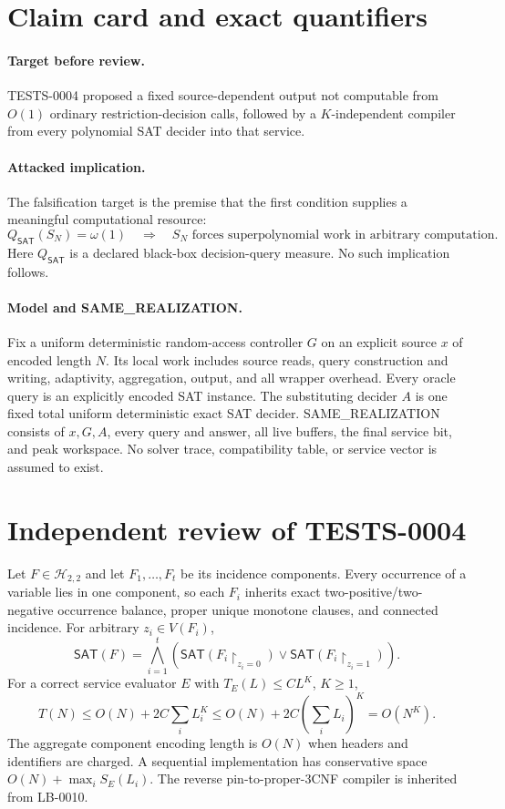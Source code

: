 \documentclass[11pt]{article}
\newcommand{\SAT}{\mathsf{SAT}}
\newcommand{\Htwo}{\mathcal H_{2,2}}
\begin{document}
\section{Claim card and exact quantifiers}

\paragraph{Target before review.}
TESTS-0004 proposed a fixed source-dependent output not computable from
$O(1)$ ordinary restriction-decision calls, followed by a $K$-independent
compiler from every polynomial SAT decider into that service.

\paragraph{Attacked implication.}
The falsification target is the premise that the first condition supplies a
meaningful computational resource:
\[
 Q_{\SAT}(S_N)=\omega(1)
 \quad\Longrightarrow\quad
 \text{$S_N$ forces superpolynomial work in arbitrary computation}.       \tag{1}
\]
Here $Q_{\SAT}$ is a declared black-box decision-query measure.  No such
implication follows.

\paragraph{Model and SAME\_REALIZATION.}
Fix a uniform deterministic random-access controller $G$ on an explicit
source $x$ of encoded length $N$.  Its local work includes source reads,
query construction and writing, adaptivity, aggregation, output, and all
wrapper overhead.  Every oracle query is an explicitly encoded SAT instance.
The substituting decider $A$ is one fixed total uniform deterministic exact
SAT decider.  SAME\_REALIZATION consists of $x,G,A$, every query and answer,
all live buffers, the final service bit, and peak workspace.  No solver trace,
compatibility table, or service vector is assumed to exist.

\section{Independent review of TESTS-0004}

Let $F\in\Htwo$ and let $F_1,\ldots,F_t$ be its incidence components.  Every
occurrence of a variable lies in one component, so each $F_i$ inherits exact
two-positive/two-negative occurrence balance, proper unique monotone clauses,
and connected incidence.  For arbitrary $z_i\in V(F_i)$,
\[
 \SAT(F)=\bigwedge_{i=1}^t
 \left(\SAT(F_i\upharpoonright_{z_i=0})\vee
       \SAT(F_i\upharpoonright_{z_i=1})\right).            \tag{2}
\]
For a correct service evaluator $E$ with $T_E(L)\le CL^K$, $K\ge1$,
\[
 T(N)\le O(N)+2C\sum_iL_i^K
 \le O(N)+2C\left(\sum_iL_i\right)^K
 =O(N^K).                                                  \tag{3}
\]
The aggregate component encoding length is $O(N)$ when headers and identifiers
are charged.  A sequential implementation has conservative space
$O(N)+\max_iS_E(L_i)$.  The reverse pin-to-proper-3CNF compiler is inherited
from LB-0010.
\end{document}
